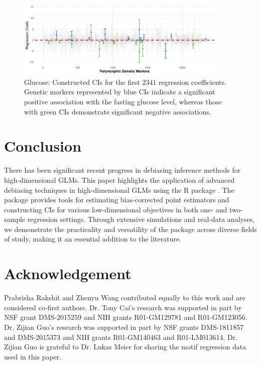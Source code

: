 \begin{figure}[!ht]
\centering
\includegraphics[width = 0.9\textwidth]{CI-Glucose.pdf}
\caption{Glucose: Constructed CIs for the first $2341$ regression coefficients. Genetic markers represented by {\color{NeonBlue} blue} CIs indicate a significant positive association with the fasting glucose level, whereas those with {\color{NeonGreen} green} CIs demonstrate significant negative associations.} 
\label{fig: logistic CI}
\end{figure}

\section{Conclusion}

There has been significant recent progress in debiasing inference methods for high-dimensional GLMs. This paper highlights the application of advanced debiasing techniques in high-dimensional GLMs using the R package . The package provides tools for estimating bias-corrected point estimators and constructing CIs for various low-dimensional objectives in both one- and two-sample regression settings. Through extensive simulations and real-data analyses, we demonstrate the practicality and versatility of the package across diverse fields of study, making it an essential addition to the literature.

\section{Acknowledgement}
Prabrisha Rakshit and Zhenyu Wang contributed equally to this work and are considered co-first authors. Dr. Tony Cai’s research was supported in part by NSF grant DMS-2015259 and NIH grants R01-GM129781 and R01-GM123056. Dr. Zijian Guo’s research was supported in part by NSF grants DMS-1811857 and DMS-2015373 and NIH grants R01-GM140463 and R01-LM013614. Dr. Zijian Guo is grateful to Dr. Lukas Meier for sharing the motif regression data used in this paper.




